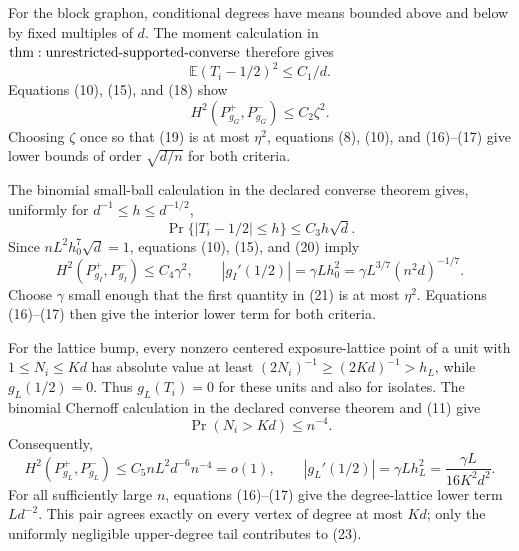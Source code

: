 For the block graphon, conditional degrees have means bounded above and below by fixed multiples of \(d\).  The moment calculation in \({\rm thm:unrestricted\text{-}supported\text{-}converse}\) therefore gives
\[
 \mathbb E(T_i-1/2)^2\leq C_1/d.
\tag{18}
\]
Equations (10), (15), and (18) show
\[
 H^2(P_{g_G}^+,P_{g_G}^-)
 \leq C_2\zeta^2.
\tag{19}
\]
Choosing \(\zeta\) once so that (19) is at most \(\eta^2\), equations (8), (10), and (16)--(17) give lower bounds of order \(\sqrt{d/n}\) for both criteria.

The binomial small-ball calculation in the declared converse theorem gives, uniformly for \(d^{-1}\leq h\leq d^{-1/2}\),
\[
 \Pr\{|T_i-1/2|\leq h\}\leq C_3h\sqrt d.
\tag{20}
\]
Since \(nL^2h_0^7\sqrt d=1\), equations (10), (15), and (20) imply
\[
 H^2(P_{g_I}^+,P_{g_I}^-)
 \leq C_4\gamma^2,\qquad
 |g_I'(1/2)|=\gamma Lh_0^2
 =\gamma L^{3/7}(n^2d)^{-1/7}.
\tag{21}
\]
Choose \(\gamma\) small enough that the first quantity in (21) is at most \(\eta^2\).  Equations (16)--(17) then give the interior lower term for both criteria.

For the lattice bump, every nonzero centered exposure-lattice point of a unit with \(1\leq N_i\leq Kd\) has absolute value at least \((2N_i)^{-1}\geq(2Kd)^{-1}>h_L\), while \(g_L(1/2)=0\).  Thus \(g_L(T_i)=0\) for these units and also for isolates.  The binomial Chernoff calculation in the declared converse theorem and (11) give
\[
 \Pr(N_i>Kd)\leq n^{-4}.
\tag{22}
\]
Consequently,
\[
 H^2(P_{g_L}^+,P_{g_L}^-)
 \leq C_5nL^2d^{-6}n^{-4}=o(1),\qquad
 |g_L'(1/2)|=\gamma Lh_L^2
 =\frac{\gamma L}{16K^2d^2}.
\tag{23}
\]
For all sufficiently large \(n\), equations (16)--(17) give the degree-lattice lower term \(Ld^{-2}\).  This pair agrees exactly on every vertex of degree at most \(Kd\); only the uniformly negligible upper-degree tail contributes to (23).

